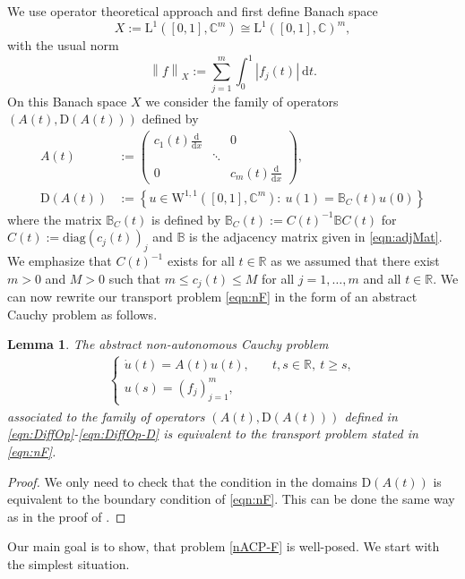 \documentclass[a4paper,oneside,10pt]{amsart}
\newtheorem{lemma}[theorem]{Lemma}
\theoremstyle{definition}
\numberwithin{equation}{section}
\def\dd{\mathrm{d}}
\def\W{\mathrm{W}}
\def\dom{\mathrm{D}}
\def\CC{\mathbb{C}}
\def\BB{\mathbb{B}}
\def\RR{\mathbb{R}}
\def\Ell{\mathrm{L}}
\def\diag{\mathrm{diag}}
\begin{document}
\medskip
We use operator theoretical approach and first define  Banach space 
\[
X:=\Ell^1\left(\left[0,1\right],\CC^m\right)\cong\Ell^1\left(\left[0,1\right],\CC\right)^m,
\]
with the usual norm
\[
\left\|f\right\|_X:=\sum_{j=1}^m\int_0^1{\left|f_j(t)\right|\ \dd{t}}.
\]
On this Banach space $X$ we consider the  family of operators $(A(t),\dom(A(t)))$ defined by
\begin{align}\label{eqn:DiffOp}
A(t)&:=\begin{pmatrix}
c_1(t)\frac{\dd}{\dd{x}}& &0\\
& \ddots &\\
0& & c_m(t)\frac{\dd}{\dd{x}}
\end{pmatrix},\\
\dom(A(t))&:=\left\{u\in \W^{1,1}\left(\left[0,1\right],\mathbb{C}^m\right):\ u(1)=\mathbb{B}_C(t)u(0)\right\}
\label{eqn:DiffOp-D}
\end{align}
where the matrix $\BB_C(t)$ is defined by $\BB_C(t):=C(t)^{-1}\BB C(t)$ for $C(t):=\diag(c_j(t))_j$ and $\BB$ is the adjacency matrix given in \eqref{eqn:adjMat}. {We emphasize that $C(t)^{-1}$ exists for all $t\in\RR$ as we assumed that there exist {$m>0$ and $M>0$} such that $m\leq c_j(t)\leq M$ for all $j=1,\ldots,m$ and all $t\in\RR$.} We can now rewrite  our transport problem \eqref{eqn:nF} in the form of an abstract Cauchy problem as follows.    

\begin{lemma}
The abstract non-autonomous Cauchy problem  
\begin{align}\label{nACP-F}
\begin{cases}
\dot{u}(t)=A(t)u(t),&\quad t,s\in\RR,\ t\geq s,\\
u(s)=(f_j)_{j=1}^m,
\end{cases}
\end{align}
associated to the family of operators $(A(t),\dom(A(t)))$ defined in \eqref{eqn:DiffOp}-\eqref{eqn:DiffOp-D} is equivalent to the transport problem stated in \eqref{eqn:nF}.
\end{lemma}

\begin{proof}
We only need to check that the condition in the domains $\dom(A(t))$ is equivalent to the boundary condition of \eqref{eqn:nF}. 
This can be done the same way as  in the proof of \cite[Prop.~18.2]{BKR2017}.
\end{proof}

Our main goal is to show, that problem \eqref{nACP-F} is well-posed. We start with the simplest  situation.
\end{document}
